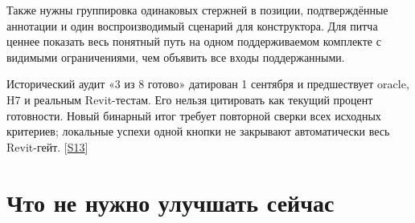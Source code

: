 \documentclass[11pt,a4paper]{article}
\begin{document}
Также нужны группировка одинаковых стержней в позиции, подтверждённые аннотации и один воспроизводимый сценарий для конструктора. Для питча ценнее показать весь понятный путь на одном поддерживаемом комплекте с видимыми ограничениями, чем объявить все входы поддержанными.


Исторический аудит «3 из 8 готово» датирован 1 сентября и предшествует oracle, H7 и реальным Revit-тестам. Его нельзя цитировать как текущий процент готовности. Новый бинарный итог требует повторной сверки всех исходных критериев; локальные успехи одной кнопки не закрывают автоматически весь Revit-гейт. {\color{Teal}\small[\hyperlink{S13}{S13}]}


\section{Что не нужно улучшать сейчас}
\end{document}
